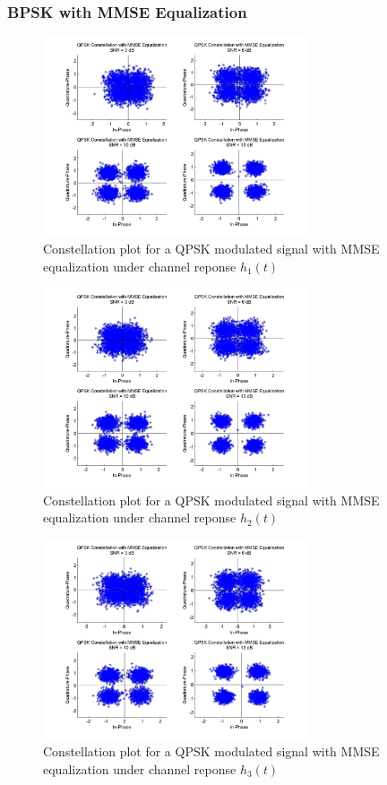 \documentclass[]{article}
\begin{document}
\subsubsection{BPSK with MMSE Equalization}

\begin{figure}[H]
\centering
\includegraphics[width=0.7\textwidth]{qpConstMMSE1.jpg}
\caption{Constellation plot for a QPSK modulated signal with MMSE equalization under channel reponse $h_1(t)$}
\end{figure}

\begin{figure}[H]
\centering
\includegraphics[width=0.7\textwidth]{qpConstMMSE2.jpg}
\caption{Constellation plot for a QPSK modulated signal with MMSE equalization under channel reponse $h_2(t)$}
\end{figure}

\begin{figure}[H]
\centering
\includegraphics[width=0.7\textwidth]{qpConstMMSE3.jpg}
\caption{Constellation plot for a QPSK modulated signal with MMSE equalization under channel reponse $h_3(t)$}
\end{figure}
\end{document}
